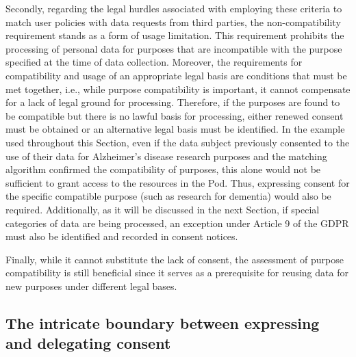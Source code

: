 Secondly, regarding the legal hurdles associated with employing these criteria to match user policies with data requests from third parties, the non-compatibility requirement stands as a form of usage limitation.
This requirement prohibits the processing of personal data for purposes that are incompatible with the purpose specified at the time of data collection.
Moreover, the requirements for compatibility and usage of an appropriate legal basis are conditions that must be met together, i.e., while purpose compatibility is important, it cannot compensate for a lack of legal ground for processing.
Therefore, if the purposes are found to be compatible but there is no lawful basis for processing, either renewed consent must be obtained or an alternative legal basis must be identified.
In the example used throughout this Section, even if the data subject previously consented to the use of their data for Alzheimer's disease research purposes and the matching algorithm confirmed the compatibility of purposes, this alone would not be sufficient to grant access to the resources in the Pod.
Thus, expressing consent for the specific compatible purpose (such as research for dementia) would also be required.
Additionally, as it will be discussed in the next Section, if special categories of data are being processed, an exception under Article 9 of the GDPR \citeyearpar{noauthor_regulation_2016} must also be identified and recorded in consent notices.

Finally, while it cannot substitute the lack of consent, the assessment of purpose compatibility is still beneficial since it serves as a prerequisite for reusing data for new purposes under different legal bases.

\subsection{The intricate boundary between expressing and delegating consent}
\label{sec:consent_delegating}

